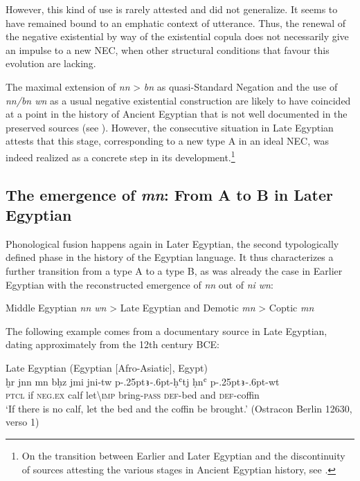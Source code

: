 \documentclass[output=paper]{langsci/langscibook}
\newcommand{\ꜥ}{ʿ}
\newcommand{\ꜣ}{\kern-.25pt\texttt{ꜣ}\kern-.6pt}
\begin{document}
However, this kind of use is rarely attested and did not generalize. It seems to have remained bound to an emphatic context of utterance. Thus, the renewal of the negative existential by way of the existential copula does not necessarily give an impulse to a new NEC, when other structural conditions that favour this evolution are lacking.  
 
The maximal extension of \textit{nn} > \textit{bn} as quasi-Standard Negation and the use of \textit{nn/bn wn} as a usual negative existential construction are likely to have coincided at a point in the history of Ancient Egyptian that is not well documented in the preserved sources (see ). However, the consecutive situation in Late Egyptian attests that this stage, corresponding to a new type A in an ideal NEC, was indeed realized as a concrete step in its development.\footnote{On the transition between Earlier and Later Egyptian and the discontinuity of sources attesting the various stages in Ancient Egyptian history, see \citet{Zoller-Engelhardt2016}.}

\subsection{The emergence of \textit{mn}: From A to B in Later Egyptian}\label{s:AE2-6}

Phonological fusion happens again in Later Egyptian, the second typologically defined phase in the history of the Egyptian language. It thus characterizes a further transition from a type A to a type B, as was already the case in Earlier Egyptian with the reconstructed emergence of \textit{nn} out of \textit{ni wn}:  
 
Middle Egyptian \textit{nn wn} > Late Egyptian and Demotic \textit{mn} > Coptic \textit{mn} 
 
The following example comes from a documentary source in Late Egyptian, dating approximately from the 12th century BCE: 
 
\ea Late Egyptian (Egyptian [Afro-Asiatic], Egypt) \label{ex:AE44}\\
    \gll ḫr jnn mn bḥz jmi jni-tw p{\ꜣ}-ḥ{\ꜥ}tj ḥn{\ꜥ} p{\ꜣ}-wt \\
    \textsc{ptcl} if \textsc{neg.ex} calf let\textbackslash\textsc{imp} bring-\textsc{pass} \textsc{def}-bed and \textsc{def}-coffin\\ 
    \glt ‘If there is no calf, let the bed and the coffin be brought.’ (Ostracon Berlin 12630, verso 1) 
\z 
\end{document}
